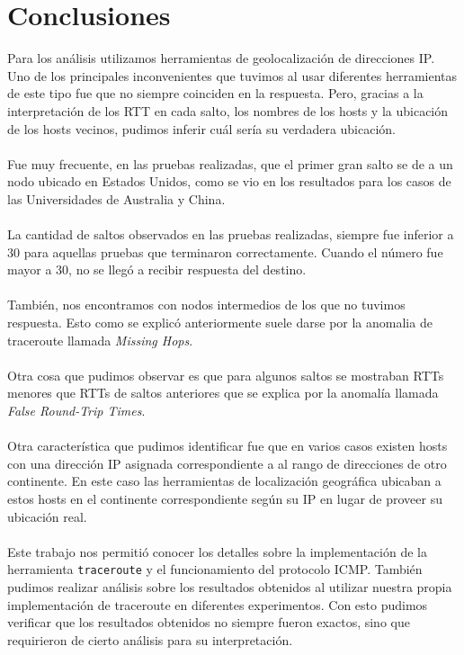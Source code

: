 \section{Conclusiones}
Para los análisis utilizamos herramientas de geolocalización de direcciones IP. Uno de los principales inconvenientes que tuvimos al usar diferentes herramientas de este tipo fue que no siempre coinciden en la respuesta. Pero, gracias a la interpretación de los RTT en cada salto, los nombres de los hosts y la ubicación de los hosts vecinos, pudimos inferir cuál sería su verdadera ubicación. 
\\\\
Fue muy frecuente, en las pruebas realizadas, que el primer gran salto se de a un nodo ubicado en Estados Unidos, como se vio en los resultados para los casos de las Universidades de Australia y China.
\\\\
La cantidad de saltos observados en las pruebas realizadas, siempre fue inferior a 30 para aquellas pruebas que terminaron correctamente. Cuando el número fue mayor a 30, no se llegó a recibir respuesta del destino.
\\\\
También, nos encontramos con nodos intermedios de los que no tuvimos respuesta. Esto como se explicó anteriormente suele darse por la anomalia de traceroute llamada \emph{Missing Hops}.
\\\\
Otra cosa que pudimos observar es que para algunos saltos se mostraban RTTs menores que RTTs de saltos anteriores que se explica por la anomalía llamada \emph{False Round-Trip Times}. 
\\\\
Otra característica que pudimos identificar fue que en varios casos existen hosts con una dirección IP asignada correspondiente a al rango de direcciones de otro continente. En este caso las herramientas de localización geográfica ubicaban a estos hosts en el continente correspondiente según su IP en lugar de proveer su ubicación real.
\\\\
Este trabajo nos permitió conocer los detalles sobre la implementación de la herramienta \texttt{traceroute} y el funcionamiento del protocolo ICMP. También pudimos realizar análisis sobre los resultados obtenidos al utilizar nuestra propia implementación de traceroute en diferentes experimentos. Con esto pudimos verificar que los resultados obtenidos no siempre fueron exactos, sino que requirieron de cierto análisis para su interpretación.